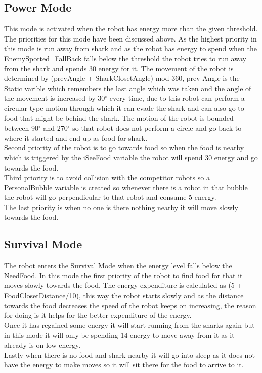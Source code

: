 \documentclass[12pt]{article}
\begin{document}
\subsection{Power Mode}
This mode is activated when the robot has energy more than the given threshold. The priorities for this mode have been discussed above. As the highest priority in this mode is run away from shark and as the robot has energy to spend when the EnemySpotted\_FallBack falls below the threshold the robot tries to run away from the shark and spends 30 energy for it. The movement of the robot is determined by (prevAngle + SharkClosetAngle) mod 360, prev Angle is the Static varible which remembers the last angle which was taken and the angle of the movement is increased by 30$^{\circ}$ every time, due to this robot can perform a circular type motion through which it can evade the shark and can also go to food that might be behind the shark. The motion of the robot is bounded between 90$^{\circ}$ and 270$^{\circ}$ so that robot does not perform a circle and go back to where it started and end up as food for shark.\\
Second priority of the robot is to go towards food so when the food is nearby which is triggered by the iSeeFood variable the robot will spend 30 energy and go towards the food.\\
Third priority is to avoid collision with the competitor robots so a PersonalBubble variable is created so whenever there is a robot in that bubble the robot will go perpendicular to that robot and consume 5 energy.\\
The last priority is when no one is there nothing nearby it will move slowly towards the food.
\subsection{Survival Mode}
The robot enters the Survival Mode when the energy level falls below the NeedFood. In this mode the first priority of the robot to find food for that it moves slowly towards the food. The energy expenditure is calculated as (5 + FoodClosetDistance/10), this way the robot starts slowly and as the distance towards the food decreases the speed of the robot keeps on increasing, the reason for doing is it helps for the better expenditure of the energy.\\
Once it has regained some energy it will start running from the sharks again but in this mode it will only be spending 14 energy to move away from it as it already is on low energy.\\
Lastly when there is no food and shark nearby it will go into sleep as it does not have the energy to make moves so it will sit there for  the food to arrive to it.
\end{document}
